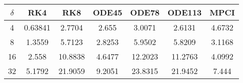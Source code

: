 \begin{tabular}{ccccccc}
\hline
$\delta$ & RK4 & RK8 & ODE45 & ODE78 & ODE113 & MPCI\\ 
\hline 
4 & 0.63841 & 2.7704 & 2.655 & 3.0071 & 2.6131 & 4.6732\\ 
8 & 1.3559 & 5.7123 & 2.8253 & 5.9502 & 5.8209 & 3.1168 \\ 
16 & 2.558 & 10.8838 & 4.6477 & 12.2023 & 11.2763 & 4.0992\\ 
32 & 5.1792 & 21.9059 & 9.2051 & 23.8315 & 21.9452 & 7.444\\ 
\hline 
\end{tabular}